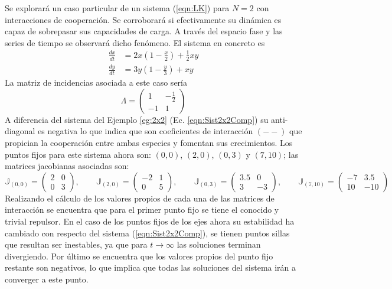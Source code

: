 \begin{ejemplo}\label{eg:2x2CoopyDemás}
	Se explorará un caso particular de un sistema (\ref{eqn:LK}) para $N=2$ con interacciones de cooperación. Se corroborará si efectivamente su dinámica es capaz de sobrepasar sus capacidades de carga. A través del espacio fase y las series de tiempo se observará dicho fenómeno. El sistema en concreto es
	\begin{equation}\label{eqn:Sist2x2Coop}
		\begin{split}
			\frac{dx}{dt} &= 2x\left (1-\frac{x}{2}\right )+\frac{1}{2}xy\\
			\frac{dy}{dt} &= 3y\left (1-\frac{y}{3}\right )+xy
		\end{split}
	\end{equation}
	La matriz de incidencias asociada a este caso sería 
	$$
	\Lambda = \begin{pmatrix}
		1 & -\frac{1}{2}\\
		-1 & 1
	\end{pmatrix}
	$$
	A diferencia del sistema del Ejemplo \ref{eg:2x2} (Ec. \ref{eqn:Sist2x2Comp}) su anti-diagonal es negativa lo que indica que son coeficientes de interacción $(--)$ que propician la cooperación entre ambas especies y fomentan sus crecimientos. Los puntos fijos para este sistema ahora son: $(0,0)$, $(2,0)$, $(0,3)$ y $(7,10)$; las matrices jacobianas asociadas son:
	$$
	\mathbb{J}_{(0,0)}=\begin{pmatrix}
		2 & 0 \\
		0 & 3
	\end{pmatrix},\qquad\mathbb{J}_{(2,0)}=\begin{pmatrix}
	-2 & 1\\
	0 & 5
	\end{pmatrix},\qquad\mathbb{J}_{(0,3)}=\begin{pmatrix}
	3.5 & 0 \\
	3 & -3
	\end{pmatrix},\qquad\mathbb{J}_{(7,10)}=\begin{pmatrix}
	-7 & 3.5\\
	10 & -10
	\end{pmatrix}
	$$
	Realizando el cálculo de los valores propios de cada una de las matrices de interacción se encuentra que para el primer punto fijo se tiene el conocido y trivial repulsor. En el caso de los puntos fijos de los ejes ahora su estabilidad ha cambiado con respecto del sistema (\ref{eqn:Sist2x2Comp}), se tienen puntos sillas que resultan ser inestables, ya que para $t\to\infty$ las soluciones terminan divergiendo. Por último se encuentra que los valores propios del punto fijo restante son negativos, lo que implica que todas las soluciones del sistema irán a converger a este punto.

\end{ejemplo}
